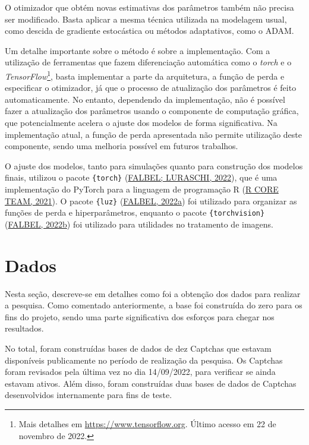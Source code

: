 \documentclass[12pt,twoside,brazilian]{book}
\begin{document}
O otimizador que obtém novas estimativas dos parâmetros também não
precisa ser modificado. Basta aplicar a mesma técnica utilizada na
modelagem usual, como descida de gradiente estocástica ou métodos
adaptativos, como o ADAM.

Um detalhe importante sobre o método é sobre a implementação. Com a
utilização de ferramentas que fazem diferenciação automática como o
\emph{torch} e o \emph{TensorFlow}\footnote{Mais detalhes em
  \url{https://www.tensorflow.org}. Último acesso em 22 de novembro de
  2022.}, basta implementar a parte da arquitetura, a função de perda e
especificar o otimizador, já que o processo de atualização dos
parâmetros é feito automaticamente. No entanto, dependendo da
implementação, não é possível fazer a atualização dos parâmetros usando
o componente de computação gráfica, que potencialmente acelera o ajuste
dos modelos de forma significativa. Na implementação atual, a função de
perda apresentada não permite utilização deste componente, sendo uma
melhoria possível em futuros trabalhos.

O ajuste dos modelos, tanto para simulações quanto para construção dos
modelos finais, utilizou o pacote \texttt{\{torch\}}
(\protect\hyperlink{ref-torch}{FALBEL; LURASCHI, 2022}), que é uma
implementação do PyTorch para a linguagem de programação R
(\protect\hyperlink{ref-rcran}{R CORE TEAM, 2021}). O pacote
\texttt{\{luz\}} (\protect\hyperlink{ref-luz}{FALBEL, 2022a}) foi
utilizado para organizar as funções de perda e hiperparâmetros, enquanto
o pacote \texttt{\{torchvision\}}
(\protect\hyperlink{ref-torchvision}{FALBEL, 2022b}) foi utilizado para
utilidades no tratamento de imagens.

\hypertarget{dados}{%
\section{Dados}\label{dados}}

Nesta seção, descreve-se em detalhes como foi a obtenção dos dados para
realizar a pesquisa. Como comentado anteriormente, a base foi construída
do zero para os fins do projeto, sendo uma parte significativa dos
esforços para chegar nos resultados.

No total, foram construídas bases de dados de dez Captchas que estavam
disponíveis publicamente no período de realização da pesquisa. Os
Captchas foram revisados pela última vez no dia 14/09/2022, para
verificar se ainda estavam ativos. Além disso, foram construídas duas
bases de dados de Captchas desenvolvidos internamente para fins de
teste.
\end{document}
